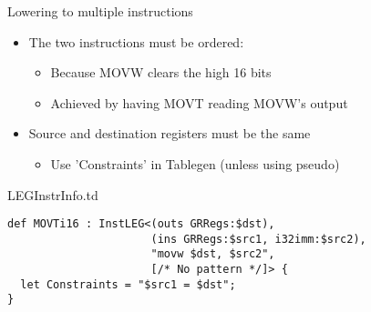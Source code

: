 
\begin{frame}[fragile]{Lowering to multiple instructions}

\begin{itemize}
    \item The two instructions must be ordered:
    \begin{itemize}
        \item Because MOVW clears the high 16 bits
        \item Achieved by having MOVT reading MOVW's output
    \end{itemize}
    \item Source and destination registers must be the same
    \begin{itemize}
        \item Use 'Constraints' in Tablegen (unless using pseudo)
    \end{itemize}
\end{itemize}

\begin{block}{LEGInstrInfo.td}
\begin{lstlisting}
def MOVTi16 : InstLEG<(outs GRRegs:$dst),
                      (ins GRRegs:$src1, i32imm:$src2),
                      "movw $dst, $src2",
                      [/* No pattern */]> {
  let Constraints = "$src1 = $dst";
}
\end{lstlisting}
\end{block}

\end{frame}


